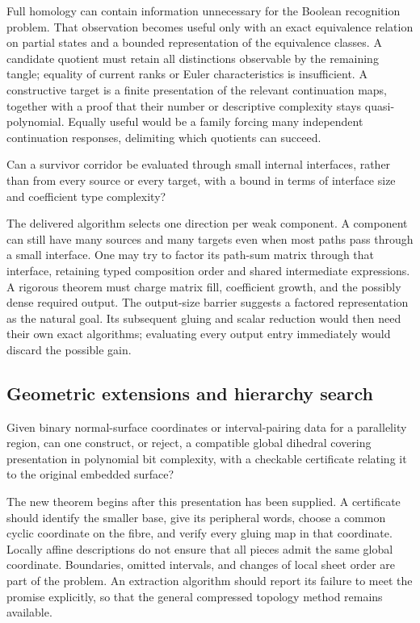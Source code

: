 Full homology can contain information unnecessary for the Boolean
recognition problem. That observation becomes useful only with an exact
equivalence relation on partial states and a bounded representation of the
equivalence classes. A candidate quotient must retain all distinctions
observable by the remaining tangle; equality of current ranks or Euler
characteristics is insufficient. A constructive target is a finite
presentation of the relevant continuation maps, together with a proof
that their number or descriptive complexity stays quasi-polynomial.
Equally useful would be a family forcing many independent continuation
responses, delimiting which quotients can succeed.

\begin{researchquestion}
Can a survivor corridor be evaluated through small internal interfaces,
rather than from every source or every target, with a bound in terms of
interface size and coefficient type complexity?
\end{researchquestion}

The delivered algorithm selects one direction per weak component. A
component can still have many sources and many targets even when most
paths pass through a small interface. One may try to factor its path-sum
matrix through that interface, retaining typed composition order and
shared intermediate expressions. A rigorous theorem must charge matrix
fill, coefficient growth, and the possibly dense required output. The
output-size barrier suggests a factored representation as the natural
goal. Its subsequent gluing and scalar reduction would then need their
own exact algorithms; evaluating every output entry immediately would
discard the possible gain.

\subsection{Geometric extensions and hierarchy search}

\begin{researchquestion}
Given binary normal-surface coordinates or interval-pairing data for a
parallelity region, can one construct, or reject, a compatible global
dihedral covering presentation in polynomial bit complexity, with a
checkable certificate relating it to the original embedded surface?
\end{researchquestion}

The new theorem begins after this presentation has been supplied. A
certificate should identify the smaller base, give its peripheral words,
choose a common cyclic coordinate on the fibre, and verify every gluing
map in that coordinate. Locally affine descriptions do not ensure that
all pieces admit the same global coordinate. Boundaries, omitted intervals,
and changes of local sheet order are part of the problem. An extraction
algorithm should report its failure to meet the promise explicitly, so
that the general compressed topology method remains available.

